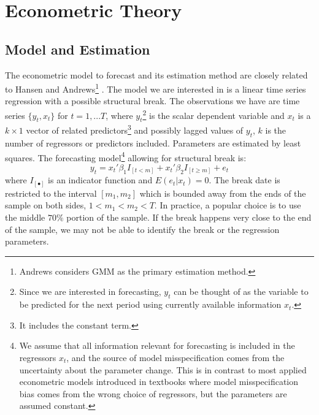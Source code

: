 \section{Econometric Theory}
\subsection{Model and Estimation}
The econometric model to forecast and its estimation method are closely related to Hansen \cite{hansen2009averaging} and Andrews\footnote{Andrews considers GMM as the primary estimation method.} \cite{andrews93}. The model we are interested in is a linear time series regression with a possible structural break. The observations we have are time series $\{y_t,x_t\}$ for $t = 1,...T$, where $y_t$\footnote{Since we are interested in forecasting, $y_t$ can be thought of as the variable to be predicted for the next period using currently available information $x_t$.} is the scalar dependent variable and $x_t$ is a $k\times 1$ vector of related predictors\footnote{It includes the constant term.} and possibly lagged values of $y_t$, $k$ is the number of regressors or predictors included. Parameters are estimated by least squares. The forecasting model\footnote{We assume that all information relevant for forecasting is included in the regressors $x_t$, and the source of model misspecification comes from the uncertainty about the parameter change. This is in contrast to most applied econometric models introduced in textbooks where model misspecification bias comes from the wrong choice of regressors, but the parameters are assumed constant.} allowing for structural break is:
\begin{equation}
	y_t = x_t'\beta_1 I_{[t<m]} + x_t'\beta_2 I_{[t \geq m]} + e_t
\end{equation}
where $I_{[\bullet]}$ is an indicator function and $E(e_t|x_t) = 0$. The break date is restricted to the interval $[m_1,m_2]$ which is bounded away from the ends of the sample on both sides, $1 < m_{1} < m_{2} < T$. In practice, a popular choice is to use the middle $70\%$ portion of the sample. If the break happens very close to the end of the sample, we may not be able to identify the break or the regression parameters.

